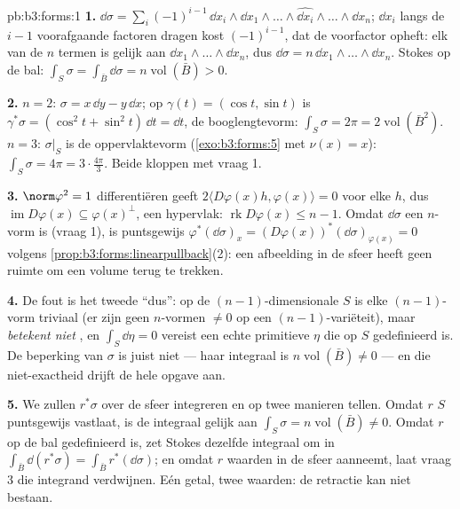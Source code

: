 \begin{solution}{pb:b3:forms:1}
\textbf{1.} $\dd\sigma = \sum_i(-1)^{i-1}\,\dd x_i\wedge\dd
x_1\wedge\dots\wedge\widehat{\dd x_i}\wedge\dots\wedge\dd x_n$;
$\dd x_i$ langs de $i-1$ voorafgaande factoren dragen kost
$(-1)^{i-1}$, dat de voorfactor opheft: elk van de $n$ termen is
gelijk aan $\dd x_1\wedge\dots\wedge\dd x_n$, dus $\dd\sigma =
n\,\dd x_1\wedge\dots\wedge\dd x_n$. Stokes op de bal:
$\int_S\sigma = \int_{\bar B}\dd\sigma = n\operatorname{vol}(\bar
B) > 0$.

\textbf{2.} $n = 2$: $\sigma = x\,\dd y - y\,\dd x$; op
$\gamma(t) = (\cos t, \sin t)$ is $\gamma^*\sigma = (\cos^2t +
\sin^2t)\,\dd t = \dd t$, de booglengtevorm: $\int_S\sigma = 2\pi
= 2\operatorname{vol}(\bar B^2)$.
$n = 3$: $\sigma\vert_S$ is de oppervlaktevorm
(\cref{exo:b3:forms:5} met $\nu(x) = x$): $\int_S\sigma = 4\pi =
3\cdot\tfrac{4\pi}3$. Beide kloppen met vraag 1.

\textbf{3.} $\norm\varphi^2 = 1$ differentiëren geeft $2\langle
D\varphi(x)h, \varphi(x)\rangle = 0$ voor elke $h$, dus
$\operatorname{im}D\varphi(x) \subseteq \varphi(x)^\perp$, een
hypervlak: $\operatorname{rk}D\varphi(x) \leq n - 1$. Omdat
$\dd\sigma$ een $n$-vorm is (vraag 1), is puntsgewijs
$\varphi^*(\dd\sigma)_x = (D\varphi(x))^*(\dd\sigma)_{\varphi(x)}
= 0$ volgens \cref{prop:b3:forms:linearpullback}(2): een
afbeelding in de sfeer heeft geen ruimte om een volume terug te
trekken.

\textbf{4.} De fout is het tweede ``dus'': op de
$(n-1)$-dimensionale $S$ is elke $(n-1)$-vorm triviaal 
(er zijn geen $n$-vormen $\neq 0$ op een
$(n-1)$-variëteit), maar \emph{ betekent niet },
en $\int_S\dd\eta = 0$ vereist een echte primitieve $\eta$ die op
$S$ gedefinieerd is. De beperking van $\sigma$ is juist niet
 --- haar integraal is $n\operatorname{vol}(\bar B) \neq 0$
--- en die niet-exactheid drijft de hele opgave aan.

\textbf{5.} We zullen $r^*\sigma$ over de sfeer integreren en op
twee manieren tellen. Omdat $r$ $S$ puntsgewijs vastlaat, is de
integraal gelijk aan $\int_S\sigma = n\operatorname{vol}(\bar B)
\neq 0$. Omdat $r$ op de bal gedefinieerd is, zet Stokes dezelfde
integraal om in $\int_{\bar B}\dd(r^*\sigma) = \int_{\bar
B}r^*(\dd\sigma)$; en omdat $r$ waarden in de sfeer aanneemt,
laat vraag 3 die integrand verdwijnen. Eén getal, twee waarden:
de retractie kan niet bestaan.


\end{solution}
